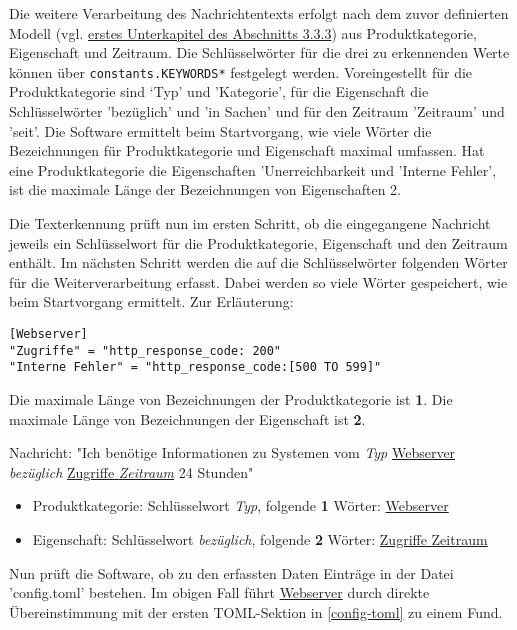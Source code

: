 Die weitere Verarbeitung des Nachrichtentexts erfolgt nach dem zuvor definierten Modell (vgl. \hyperref[sec:syntax]{erstes Unterkapitel des Abschnitts 3.3.3}) aus Produktkategorie, Eigenschaft und Zeitraum. Die Schlüsselwörter für die drei zu erkennenden Werte können über \lstinline{constants.KEYWORDS*} festgelegt werden. Voreingestellt für die Produktkategorie sind ‘Typ' und 'Kategorie', für die Eigenschaft die Schlüsselwörter 'bezüglich' und 'in Sachen' und für den Zeitraum 'Zeitraum' und 'seit'. Die Software ermittelt beim Startvorgang, wie viele Wörter die Bezeichnungen für Produktkategorie und Eigenschaft maximal umfassen. Hat eine Produktkategorie die Eigenschaften 'Unerreichbarkeit und 'Interne Fehler', ist die maximale Länge der Bezeichnungen von Eigenschaften 2. 

Die Texterkennung prüft nun im ersten Schritt, ob die eingegangene Nachricht jeweils ein Schlüsselwort für die Produktkategorie, Eigenschaft und den Zeitraum enthält. Im nächsten Schritt werden die auf die Schlüsselwörter folgenden Wörter für die Weiterverarbeitung erfasst. Dabei werden so viele Wörter gespeichert, wie beim Startvorgang ermittelt. Zur Erläuterung:

\begin{lstlisting}[caption={Beispiel für eine mögliche Konfiguration in der Datei config.toml}, label=config-toml, xleftmargin=6mm]
[Webserver]
"Zugriffe" = "http_response_code: 200"
"Interne Fehler" = "http_response_code:[500 TO 599]"
\end{lstlisting}

Die maximale Länge von Bezeichnungen der Produktkategorie ist \textbf{1}. Die maximale Länge von Bezeichnungen der Eigenschaft ist \textbf{2}.

Nachricht: "Ich benötige Informationen zu Systemen vom \textit{Typ} \uline{Webserver} \textit{bezüglich} \uline{Zugriffe \textit{Zeitraum}} 24 Stunden"

\begin{itemize}
\item Produktkategorie: Schlüsselwort \textit{Typ}, folgende \textbf{1} Wörter: \uline{Webserver}
\item Eigenschaft: Schlüsselwort \textit{bezüglich}, folgende \textbf{2} Wörter: \uline{Zugriffe Zeitraum}
\end{itemize}

Nun prüft die Software, ob zu den erfassten Daten Einträge in der Datei 'config.toml' bestehen. Im obigen Fall führt \uline{Webserver} durch direkte Übereinstimmung mit der ersten TOML-Sektion in \autoref{config-toml} zu einem Fund. 

